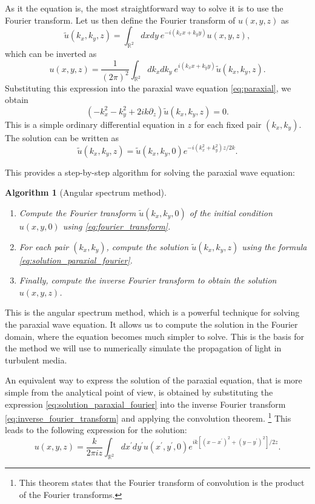 \documentclass[openany,a4paper,oneside,11pt]{article}
\newtheorem{alg}{Algorithm}
\begin{document}
As it the equation is, the most straightforward way to solve it is to use the Fourier transform. Let us then define the Fourier transform of $u(x,y,z)$ as
\begin{equation}
\label{eq:fourier_transform}
    \tilde{u}(k_x, k_y,z) = \int_{\mathbb{R}^2} dx dy \ e^{-i(k_x x + k_y y)} u(x,y,z),
\end{equation}
which can be inverted as
\begin{equation}
\label{eq:inverse_fourier_transform}
    u(x,y,z) = \frac{1}{(2\pi)^2} \int_{\mathbb{R}^2} dk_x dk_y \ e^{i(k_x x + k_y y)} \tilde{u}(k_x, k_y,z).
\end{equation}
Substituting this expression into the paraxial wave equation \eqref{eq:paraxial}, we obtain
\begin{equation}
    \left( -k_x^2 - k_y^2 + 2ik \partial_z \right) \tilde{u}(k_x, k_y,z) = 0.
\end{equation}
This is a simple ordinary differential equation in $z$ for each fixed pair $(k_x, k_y)$. The solution can be written as
\begin{equation}
\label{eq:solution_paraxial_fourier}
    \tilde{u}(k_x, k_y,z) = \tilde{u}(k_x, k_y,0) e^{-i(k_x^2 + k_y^2)z/2k}.
\end{equation}

This provides a step-by-step algorithm for solving the paraxial wave equation:
\begin{alg}[Angular spectrum method]
\leavevmode
\begin{enumerate}
    \item Compute the Fourier transform $\tilde{u}(k_x, k_y,0)$ of the initial condition $u(x,y,0)$ using \eqref{eq:fourier_transform}.
    \item For each pair $(k_x, k_y)$, compute the solution $\tilde{u}(k_x, k_y,z)$ using the formula \eqref{eq:solution_paraxial_fourier}.
    \item Finally, compute the inverse Fourier transform to obtain the solution $u(x,y,z)$.
\end{enumerate}
\end{alg}

This is the angular spectrum method, which is a powerful technique for solving the paraxial wave equation. It allows us to compute the solution in the Fourier domain, where the equation becomes much simpler to solve. This is the basis for the method we will use to numerically simulate the propagation of light in turbulent media.

An equivalent way to express the solution of the paraxial equation, that is more simple from the analytical point of view, is obtained by substituting the expression \eqref{eq:solution_paraxial_fourier} into the inverse Fourier transform \eqref{eq:inverse_fourier_transform} and applying the convolution theorem. \footnote{This theorem states that the Fourier transform of convolution is the product of the Fourier transforms.} This leads to the following expression for the solution:
\begin{equation}
\label{eq:fresnel_diffraction}
    u(x,y,z) = \frac{k}{2\pi i z} \int_{\mathbb{R}^2} dx^\prime dy^\prime u(x^\prime,y^\prime,0) e^{ik\left[ (x-x^\prime)^2 + (y-y^\prime)^2 \right] / 2z}.
\end{equation}
\end{document}
